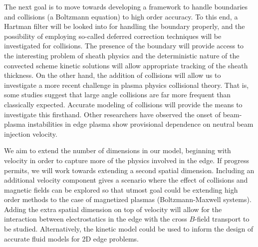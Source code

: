 \documentclass[11pt,titlepage]{report}
\begin{document}
The next goal is to move towards developing a framework to handle boundaries and collisions (a Boltzmann equation) to high order accuracy. To this end, a Hartman filter will be looked into for handling the boundary properly, and the possibility of employing so-called deferred correction techniques will be investigated for collisions. The presence of the boundary will provide access to the interesting problem of sheath physics and the deterministic nature of the convected scheme kinetic solutions will allow appropriate tracking of the sheath thickness. On the other hand, the addition of collisions will allow us to investigate a more recent challenge in plasma physics collisional theory. That is, some studies suggest that large angle collisions are far more frequent than classically expected. Accurate modeling of collisions will provide the means to investigate this firsthand. Other researchers have observed the onset of beam-plasma instabilities in edge plasma show provisional dependence on neutral beam injection velocity. 

We aim to extend the number of dimensions in our model, beginning with velocity in order to capture more of the physics involved in the edge. If progress permits, we will work towards extending a second spatial dimension. Including an additional velocity component gives a scenario where the effect of collisions and magnetic fields can be explored so that utmost goal could be extending high order methods to the case of magnetized plasmas (Boltzmann-Maxwell systems). Adding the extra spatial dimension on top of velocity will allow for the interaction between electrostatics in the edge with the cross $B$-field transport to be studied. Alternatively, the kinetic model could be used to inform the design of accurate fluid models for 2D edge problems.

\newpage




\end{document}
